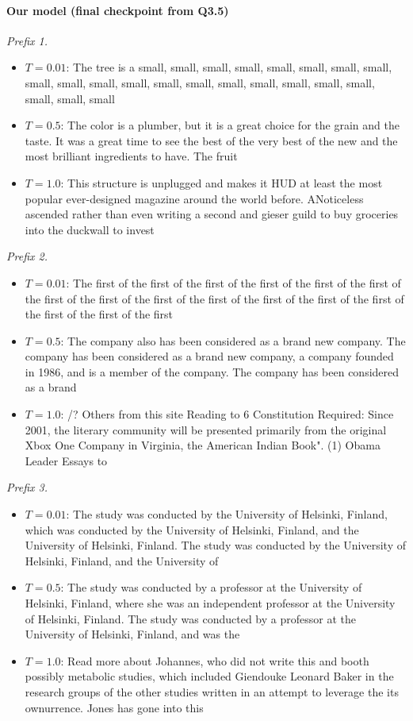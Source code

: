 \paragraph{Our model (final checkpoint from Q3.5)}
\noindent\textit{Prefix 1.}\begin{itemize}
  \item $T=0.01$: \textcolor{blue!60!black}{The tree is a small, small, small, small, small, small, small, small, small, small, small, small, small, small, small, small, small, small, small, small, small, small}
  \item $T=0.5$: \textcolor{blue!60!black}{The color is a plumber, but it is a great choice for the grain and the taste. It was a great time to see the best of the very best of the new and the most brilliant ingredients to have. The fruit}
  \item $T=1.0$: \textcolor{blue!60!black}{This structure is unplugged and makes it HUD at least the most popular ever-designed magazine around the world before. ANoticeless ascended rather than even writing a second and gieser guild to buy groceries into the duckwall to invest}
\end{itemize}
\noindent\textit{Prefix 2.}\begin{itemize}
  \item $T=0.01$: \textcolor{blue!60!black}{The first of the first of the first of the first of the first of the first of the first of the first of the first of the first of the first of the first of the first of the first of the first of the first}
  \item $T=0.5$: \textcolor{blue!60!black}{The company also has been considered as a brand new company. The company has been considered as a brand new company, a company founded in 1986, and is a member of the company. The company has been considered as a brand}
  \item $T=1.0$: \textcolor{blue!60!black}{/? Others from this site Reading to 6 Constitution Required: Since 2001, the literary community will be presented primarily from the original Xbox One Company in Virginia, the American Indian Book". (1) Obama Leader Essays to}
\end{itemize}
\noindent\textit{Prefix 3.}\begin{itemize}
  \item $T=0.01$: \textcolor{blue!60!black}{The study was conducted by the University of Helsinki, Finland, which was conducted by the University of Helsinki, Finland, and the University of Helsinki, Finland. The study was conducted by the University of Helsinki, Finland, and the University of}
  \item $T=0.5$: \textcolor{blue!60!black}{The study was conducted by a professor at the University of Helsinki, Finland, where she was an independent professor at the University of Helsinki, Finland. The study was conducted by a professor at the University of Helsinki, Finland, and was the}
  \item $T=1.0$: \textcolor{blue!60!black}{Read more about Johannes, who did not write this and booth possibly metabolic studies, which included Giendouke Leonard Baker in the research groups of the other studies written in an attempt to leverage the its ownurrence. Jones has gone into this}
\end{itemize}
